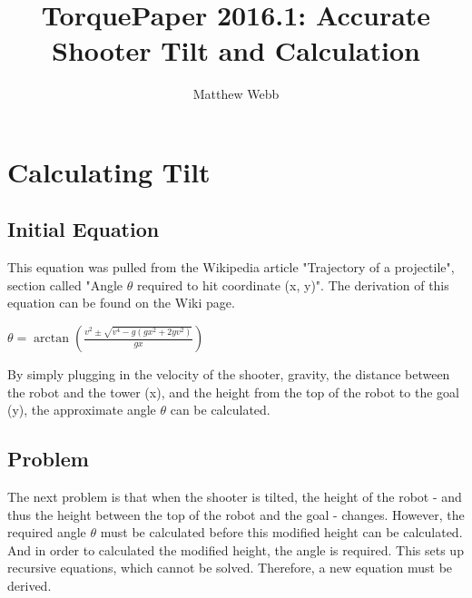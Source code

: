 \documentclass[a4paper,12pt]{report}
\author{Matthew Webb}
\title{TorquePaper 2016.1: Accurate Shooter Tilt and Calculation}
\newcommand{\tab}{\hspace{20pt}}
\begin{document}
	\maketitle
	\tableofcontents
	
	\chapter{Calculating Tilt}
	\section{Initial Equation}
	
	\tab This equation was pulled from the Wikipedia article "Trajectory of a projectile", section called "Angle $\theta$ required to hit coordinate (x, y)". The derivation of this equation can be found on the Wiki page.
	\begin{center}
		\(\theta=\arctan{(\frac{v^2 \pm \sqrt{v^4 - g(gx^2 + 2yv^2)}}{gx})}\)
	\end{center}
	\tab By simply plugging in the velocity of the shooter, gravity, the distance between the robot and the tower (x), and the height from the top of the robot to the goal (y), the approximate angle $\theta$ can be calculated.
	\section{Problem}
	\tab The next problem is that when the shooter is tilted, the height of the robot - and thus the height between the top of the robot and the goal - changes. However, the required angle $\theta$ must be calculated before this modified height can be calculated. And in order to calculated the modified height, the angle is required. This sets up recursive equations, which cannot be solved. Therefore, a new equation must be derived.
\end{document}
